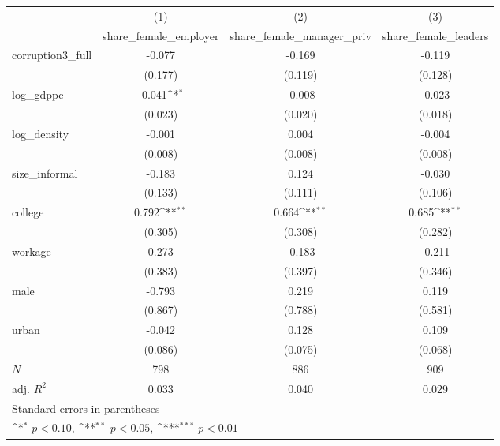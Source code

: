 {
\def\sym#1{\ifmmode^{#1}\else\(^{#1}\)\fi}
\begin{tabular}{l*{3}{c}}
\hline\hline
            &\multicolumn{1}{c}{(1)}&\multicolumn{1}{c}{(2)}&\multicolumn{1}{c}{(3)}\\
            &\multicolumn{1}{c}{share\_female\_employer}&\multicolumn{1}{c}{share\_female\_manager\_priv}&\multicolumn{1}{c}{share\_female\_leaders}\\
\hline
corruption3\_full&      -0.077         &      -0.169         &      -0.119         \\
            &     (0.177)         &     (0.119)         &     (0.128)         \\
[1em]
log\_gdppc   &      -0.041\sym{*}  &      -0.008         &      -0.023         \\
            &     (0.023)         &     (0.020)         &     (0.018)         \\
[1em]
log\_density &      -0.001         &       0.004         &      -0.004         \\
            &     (0.008)         &     (0.008)         &     (0.008)         \\
[1em]
size\_informal&      -0.183         &       0.124         &      -0.030         \\
            &     (0.133)         &     (0.111)         &     (0.106)         \\
[1em]
college     &       0.792\sym{**} &       0.664\sym{**} &       0.685\sym{**} \\
            &     (0.305)         &     (0.308)         &     (0.282)         \\
[1em]
workage     &       0.273         &      -0.183         &      -0.211         \\
            &     (0.383)         &     (0.397)         &     (0.346)         \\
[1em]
male        &      -0.793         &       0.219         &       0.119         \\
            &     (0.867)         &     (0.788)         &     (0.581)         \\
[1em]
urban       &      -0.042         &       0.128         &       0.109         \\
            &     (0.086)         &     (0.075)         &     (0.068)         \\
\hline
\(N\)       &         798         &         886         &         909         \\
adj. \(R^{2}\)&       0.033         &       0.040         &       0.029         \\
\hline\hline
\multicolumn{4}{l}{\footnotesize Standard errors in parentheses}\\
\multicolumn{4}{l}{\footnotesize \sym{*} \(p<0.10\), \sym{**} \(p<0.05\), \sym{***} \(p<0.01\)}\\
\end{tabular}
}
